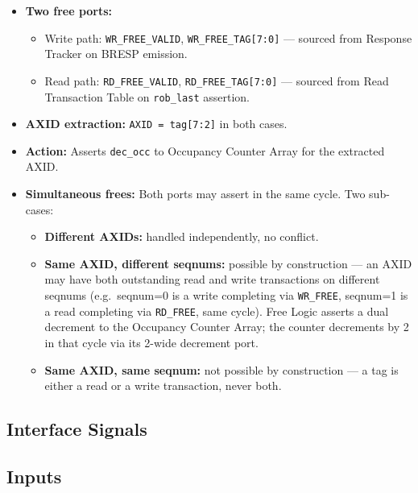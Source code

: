 \begin{itemize}
  \item \textbf{Two free ports:}
  \begin{itemize}
    \item Write path: \texttt{WR\_FREE\_VALID}, \texttt{WR\_FREE\_TAG[7:0]}
          — sourced from Response Tracker on BRESP emission.
    \item Read path: \texttt{RD\_FREE\_VALID}, \texttt{RD\_FREE\_TAG[7:0]}
          — sourced from Read Transaction Table on \texttt{rob\_last}
          assertion.
  \end{itemize}
  \item \textbf{AXID extraction:} \texttt{AXID = tag[7:2]} in both cases.
  \item \textbf{Action:} Asserts \texttt{dec\_occ} to Occupancy Counter
        Array for the extracted AXID.
  \item \textbf{Simultaneous frees:} Both ports may assert in the same
        cycle. Two sub-cases:
  \begin{itemize}
    \item \textbf{Different AXIDs:} handled independently, no conflict.
    \item \textbf{Same AXID, different seqnums:} possible by construction
          — an AXID may have both outstanding read and write transactions
          on different seqnums (e.g.\ seqnum=0 is a write completing via
          \texttt{WR\_FREE}, seqnum=1 is a read completing via
          \texttt{RD\_FREE}, same cycle). Free Logic asserts a dual
          decrement to the Occupancy Counter Array; the counter decrements
          by 2 in that cycle via its 2-wide decrement port.
    \item \textbf{Same AXID, same seqnum:} not possible by construction
          — a tag is either a read or a write transaction, never both.
  \end{itemize}
\end{itemize}

\subsection{Interface Signals}

\subsection{Inputs}

